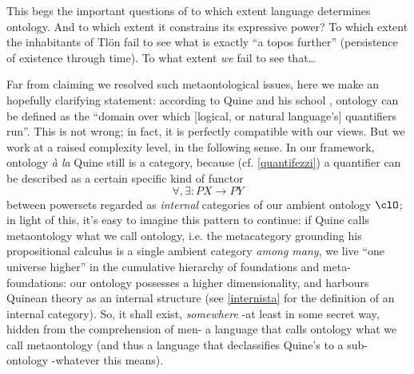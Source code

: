 This begs the important questions of to which extent language determines ontology. And to which extent it constrains its expressive power? To which extent the inhabitants of Tl\"on fail to see what is exactly ``a topos further'' (persistence of existence through time). To what extent \emph{we} fail to see that\dots



Far from claiming we resolved such metaontological issues, here we make an hopefully clarifying statement: according to Quine and his school \cite{}, ontology can be defined as the ``domain over which [logical, or natural language's] quantifiers run''. This is not wrong; in fact, it is perfectly compatible with our views. But we work at a raised complexity level, in the following sense. In our framework, ontology \emph{à la} Quine still is a category, because (cf. \autoref{quantifezzi}) a quantifier can be described as a certain specific kind of functor
\[\forall,\exists : PX \to PY\]
between powersets regarded as \emph{internal} categories of our ambient ontology $\clO$; in light of this, it's easy to imagine this pattern to continue: if Quine calls metaontology what we call ontology, i.e. the metacategory grounding his propositional calculus is a single ambient category \emph{among many}, we live ``one universe higher'' in the cumulative hierarchy of foundations and meta-foundations: our ontology possesses a higher dimensionality, and harbours Quinean theory as an internal structure (see \autoref{internista} for the definition of an internal category). So, it shall exist, \emph{somewhere} -at least in some secret way, hidden from the comprehension of men- a language that calls ontology what we call metaontology (and thus a language that declassifies Quine's to a sub-ontology -whatever this means).

